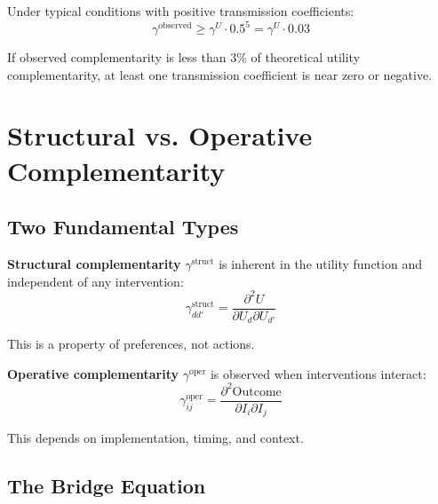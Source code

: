 \begin{corollary}
Under typical conditions with positive transmission coefficients:
\begin{equation}
\gamma^{\text{observed}} \geq \gamma^U \cdot 0.5^5 = \gamma^U \cdot 0.03
\end{equation}

If observed complementarity is less than 3\% of theoretical utility
complementarity, at least one transmission coefficient is near zero or negative.
\end{corollary}

\section{Structural vs. Operative Complementarity}
\label{sec:gtc-structural-operative}

\subsection{Two Fundamental Types}

\begin{definition}
\textbf{Structural complementarity} $\gamma^{\text{struct}}$ is inherent in the
utility function and independent of any intervention:
\begin{equation}
\gamma^{\text{struct}}_{dd'} = \frac{\partial^2 U}{\partial U_d \partial U_{d'}}
\end{equation}

This is a property of preferences, not actions.
\end{definition}

\begin{definition}
\textbf{Operative complementarity} $\gamma^{\text{oper}}$ is observed when
interventions interact:
\begin{equation}
\gamma^{\text{oper}}_{ij} = \frac{\partial^2 \text{Outcome}}{\partial I_i \partial I_j}
\end{equation}

This depends on implementation, timing, and context.
\end{definition}

\subsection{The Bridge Equation}

